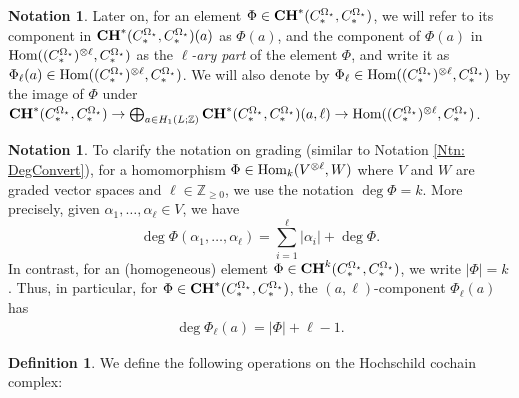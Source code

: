 \documentclass[10pt]{amsart}
\numberwithin{equation}{section}
\theoremstyle{plain}
\theoremstyle{definition}
\newtheorem{definition}[theorem]{Definition}
\newtheorem{notation}[theorem]{Notation}
\theoremstyle{remark}
\numberwithin{equation}{section}
\newcommand{\Z}{\mathbb{Z}}
\newcommand{\Hom}{\textup{Hom}}
\newcommand{\CC}{\textbf{\textup{CH}}}
\newcommand{\CBa}{C_*^{\Omega_\star}}
\begin{document}
{\begin{notation}\label{Ntn: l-ary}
Later on, for an element $\Phi\in \CC^*(\CBa,\CBa)$, we will refer to its component in $\CC^*(\CBa,\CBa)(a)$ as $\Phi(a)$, and the component of $\Phi(a)$ in $\Hom((\CBa)^{\otimes \ell}, \CBa)$ as the \emph{$\ell$-ary part} of the element $\Phi$, and write it as $\Phi_\ell(a)\in \Hom((\CBa)^{\otimes \ell}, \CBa)$. We will also denote by $\Phi_\ell \in \Hom((\CBa)^{\otimes \ell},\CBa)$ by the image of $\Phi$ under $\CC^*(\CBa,\CBa)\to \bigoplus_{a\in H_1(L;\Z)} \CC^*(\CBa,\CBa)(a,\ell) \to \Hom((\CBa)^{\otimes \ell},\CBa)$.
\end{notation}
\begin{notation}
	To clarify the notation on grading (similar to Notation \ref{Ntn: DegConvert}), for a homomorphism $\Phi \in \Hom_k(V^{\otimes \ell},W)$ where $V$ and $W$ are graded vector spaces and $\ell\in \Z_{\geq 0}$, we use the notation $\deg \Phi = k$. More precisely, given $\alpha_1,\dots, \alpha_\ell \in V$, we have \[ \deg \Phi(\alpha_1,\dots, \alpha_\ell) = \sum_{i=1}^\ell  |\alpha_i|  + \deg \Phi.\]
	In contrast, for an (homogeneous) element $\Phi \in \CC^k(\CBa,\CBa)$, we write $|\Phi| = k$. Thus, in particular, for $\Phi\in \CC^*(\CBa,\CBa)$, the $(a,\ell)$-component $\Phi_\ell(a)$ has \begin{align}\label{Eq: DegConvertHoch} \deg\Phi_\ell(a) = |\Phi| + \ell -1. \end{align}
\end{notation}





\begin{definition}
We define the following operations on the Hochschild cochain complex: 


\end{definition}}
\end{document}
